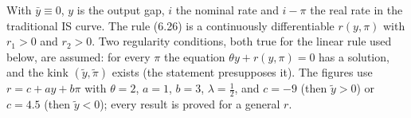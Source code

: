 
\noindent With $\bar y\equiv0$, $y$ is the output gap, $i$ the nominal rate and $i-\pi$ the real rate in the
traditional IS curve. The rule (6.26) is a continuously differentiable $r(y,\pi)$ with $r_1>0$ and
$r_2>0$. Two regularity conditions, both true for the linear rule used below, are assumed: for every
$\pi$ the equation $\theta y+r(y,\pi)=0$ has a solution, and the kink $(\tilde y,\tilde\pi)$ exists (the
statement presupposes it). The figures use $r=c+ay+b\pi$ with $\theta=2$, $a=1$, $b=3$, $\lambda=\frac12$,
and $c=-9$ (then $\tilde y>0$) or $c=4.5$ (then $\tilde y<0$); every result is proved for a general $r$.

